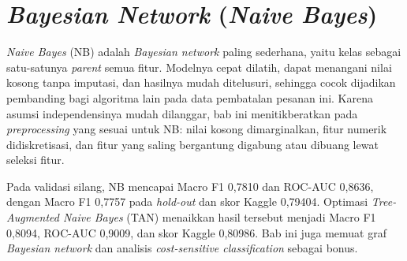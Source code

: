\section{\textit{Bayesian Network} (\textit{Naive Bayes})}
\label{sec:nb}

\textit{Naive Bayes} (NB) adalah \textit{Bayesian network} paling sederhana, yaitu kelas sebagai satu-satunya \textit{parent} semua fitur. Modelnya cepat dilatih, dapat menangani nilai kosong tanpa imputasi, dan hasilnya mudah ditelusuri, sehingga cocok dijadikan pembanding bagi algoritma lain pada data pembatalan pesanan ini. Karena asumsi independensinya mudah dilanggar, bab ini menitikberatkan pada \textit{preprocessing} yang sesuai untuk NB: nilai kosong dimarginalkan, fitur numerik didiskretisasi, dan fitur yang saling bergantung digabung atau dibuang lewat seleksi fitur.

Pada validasi silang, NB mencapai Macro F1 0,7810 dan ROC-AUC 0,8636, dengan Macro F1 0,7757 pada \textit{hold-out} dan skor Kaggle 0,79404. Optimasi \textit{Tree-Augmented Naive Bayes} (TAN) menaikkan hasil tersebut menjadi Macro F1 0,8094, ROC-AUC 0,9009, dan skor Kaggle 0,80986. Bab ini juga memuat graf \textit{Bayesian network} dan analisis \textit{cost-sensitive classification} sebagai bonus.






